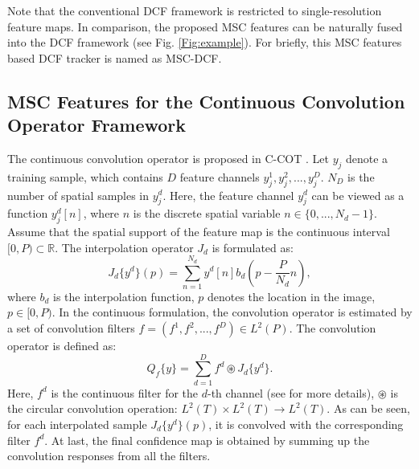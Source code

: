\documentclass[runningheads]{llncs}
\begin{document}
Note that the conventional DCF framework is restricted to single-resolution feature maps. In comparison, the proposed MSC features can be naturally fused into the DCF framework (see Fig. \ref{Fig:example}). For briefly, this MSC features based DCF tracker is named as MSC-DCF.  %

\subsection{MSC Features for the Continuous Convolution Operator Framework}
The continuous convolution operator is proposed in C-COT \cite{CCOT}. Let $y_{j}$ denote a training sample, which contains $D$ feature channels $y_{j}^{1},y_{j}^{2}, ...,y_{j}^{D}$. $N_D$ is the number of spatial samples in $y_{j}^{d}$. Here, the feature channel $y_{j}^{d}$ can be viewed as a function $y_{j}^{d}[n]$, where $n$ is the discrete spatial variable $n\in\{0,...,N_d-1\}$. Assume that the spatial support of the feature map is the continuous interval $[0,P)\subset \mathbb{R}$. The interpolation operator $J_d$ is formulated as:
\begin{equation}\label{Jd}
J_{d}\{y^{d}\}(p) = \sum_{n=1}^{N_d}y^{d}[n]b_{d}(p-\frac{P}{N_d}n),
\end{equation}
where $b_d$ is the interpolation function, $p$ denotes the location in the image, $p\in[0, P)$. In the continuous formulation, the convolution operator is estimated by a set of convolution filters $f=(f^1, f^2,...,f^D)\in L^{2}(P)$. The convolution operator is defined as:
\begin{equation}\label{conv}
Q_{f}\{y\} = \sum_{d=1}^{D}f^{d}\circledast J_{d}\{y^{d}\}.
\end{equation}
Here, $f^d$ is the continuous filter for the $d$-th channel (see \cite{CCOT} for more details), $\circledast$ is the circular convolution operation: $L^2(T)\times L^2(T)  \rightarrow L^2(T)$. As can be seen, for each interpolated sample $J_{d}\{y^{d}\}(p)$, it is convolved with the corresponding filter $f^d$. At last, the final confidence map is obtained by summing up the convolution responses from all the filters. 
\end{document}
